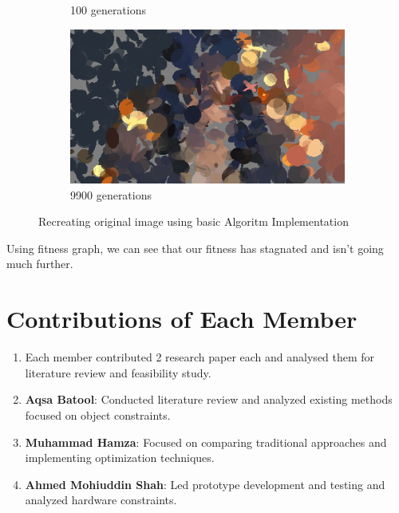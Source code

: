 \documentclass[10pt, conference]{IEEEtran}
\begin{document}
\begin{figure}[h]
\begin{subfigure}{0.4\linewidth}
        \caption{100 generations}
    \end{subfigure}
    \begin{subfigure}{0.4\linewidth}
        \centering
        \includegraphics[width=\linewidth]{generated_9900.png}
        \caption{9900 generations}
    \end{subfigure}
    \caption{Recreating original image using basic Algoritm Implementation}
\end{figure}

Using fitness graph, we can see that our fitness has stagnated and isn't going much further.

\section{Contributions of Each Member}

\begin{enumerate}[label=\arabic*)]
    \item  Each member contributed 2 research paper each and analysed them for literature review and feasibility study.
    \item \textbf{Aqsa Batool}: Conducted literature review and analyzed existing methods focused on object constraints.
    \item \textbf{Muhammad Hamza}: Focused on comparing traditional approaches and implementing optimization techniques.
    \item \textbf{Ahmed Mohiuddin Shah}: Led prototype development and testing and analyzed hardware constraints.
\end{enumerate}
\end{document}
